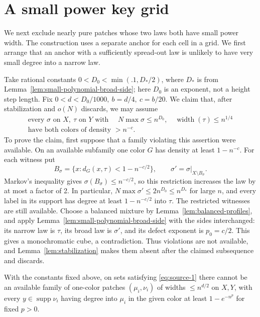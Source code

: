 \section{A small power key grid}
\label{sec:a-small-power-key-grid}

We next exclude nearly pure patches whose two laws both have small power
width. The construction uses a separate anchor for each cell in a grid.
We first arrange that an anchor with a sufficiently spread-out law is
unlikely to have very small degree into a narrow law.

Take rational constants \(0<D_0<\min(.1,D_*/2)\), where \(D_*\) is from
Lemma~\ref{lem:small-polynomial-broad-side}; here \(D_0\) is an exponent,
not a height step length. Fix
\(0<d<D_0/1000,\ b=d/4,\ c=b/20\). We claim that, after stabilization
and \(o(N)\) discards, we may assume
\begin{equation}
 \begin{gathered}
 \text{every }\sigma\text{ on }X,\ \tau\text{ on }Y\text{ with }\quad
 N\max\sigma\le n^{D_0},\quad \operatorname{width}(\tau)\le n^{1/4}\\
 \text{have both colors of density }> n^{-c}.
 \end{gathered}\label{eq:source-1}
\end{equation}
To prove the claim, first suppose that a family violating this assertion
were available. On an available subfamily one color \(G\) has density at
least \(1-n^{-c}\). For each witness put
\[
 B_\sigma=\{x:d_G(x,\tau)<1-n^{-c/2}\},\qquad
 \sigma'=\sigma|_{X\setminus B_\sigma}.
\]
Markov's inequality gives \(\sigma(B_\sigma)\le n^{-c/2}\), so this
restriction increases the law by at most a factor of 2. In particular,
\(N\max\sigma'\le2n^{D_0}\le n^{D_*}\) for large \(n\), and every
label in its support has degree at least \(1-n^{-c/2}\) into \(\tau\).
The restricted witnesses are still available. Choose a balanced mixture
by Lemma~\ref{lem:balanced-profiles}, and apply
Lemma~\ref{lem:small-polynomial-broad-side} with the sides interchanged:
its narrow law is \(\tau\), its broad law is \(\sigma'\), and its defect
exponent is \(p_0=c/2\). This gives a monochromatic cube, a
contradiction. Thus violations are not available, and
Lemma~\ref{lem:stabilization} makes them absent after the claimed
subsequence and discards.

\begin{lemma}\label{lem:small-grid-purity}
With the constants fixed above, on sets satisfying \eqref{eq:source-1}
there cannot be an available family of one-color patches
\((\mu_i,\nu_i)\) of widths \(\le n^{d/2}\) on \(X,Y\), with every
\(y\in\operatorname{supp}\nu_i\) having degree into \(\mu_i\) in the
given color at least \(1-e^{-n^{p}}\) for fixed \(p>0\).
\end{lemma}


